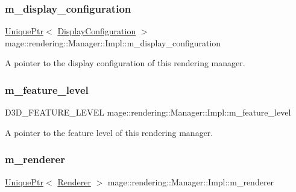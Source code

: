 \subsubsection{\texorpdfstring{m\+\_\+display\+\_\+configuration}{m\_display\_configuration}}
{\footnotesize\ttfamily \mbox{\hyperlink{namespacemage_a3316d7143a973e37adf1110f2e80ca31}{Unique\+Ptr}}$<$ \mbox{\hyperlink{classmage_1_1rendering_1_1_display_configuration}{Display\+Configuration}} $>$ mage\+::rendering\+::\+Manager\+::\+Impl\+::m\+\_\+display\+\_\+configuration\hspace{0.3cm}{\ttfamily [private]}}

A pointer to the display configuration of this rendering manager. \mbox{\label{classmage_1_1rendering_1_1_manager_1_1_impl_afdf5967267574a49bba12f5478ba6325}} 
\subsubsection{\texorpdfstring{m\+\_\+feature\+\_\+level}{m\_feature\_level}}
{\footnotesize\ttfamily D3\+D\+\_\+\+F\+E\+A\+T\+U\+R\+E\+\_\+\+L\+E\+V\+EL mage\+::rendering\+::\+Manager\+::\+Impl\+::m\+\_\+feature\+\_\+level\hspace{0.3cm}{\ttfamily [private]}}

A pointer to the feature level of this rendering manager. \mbox{\label{classmage_1_1rendering_1_1_manager_1_1_impl_aa15b0df6ab64a8c03cd4aa23cb78adb4}} 
\subsubsection{\texorpdfstring{m\+\_\+renderer}{m\_renderer}}
{\footnotesize\ttfamily \mbox{\hyperlink{namespacemage_a3316d7143a973e37adf1110f2e80ca31}{Unique\+Ptr}}$<$ \mbox{\hyperlink{classmage_1_1rendering_1_1_renderer}{Renderer}} $>$ mage\+::rendering\+::\+Manager\+::\+Impl\+::m\+\_\+renderer\hspace{0.3cm}{\ttfamily [private]}}

